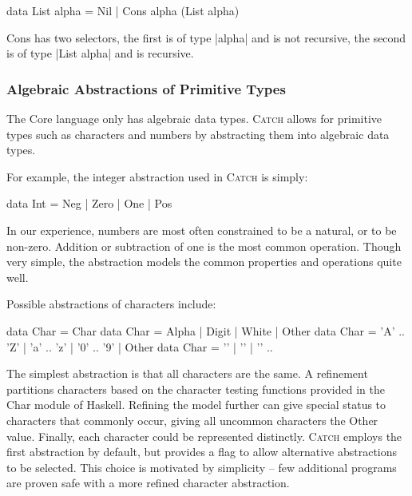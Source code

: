 \documentclass[preprint]{sigplanconf}
\newcommand{\C}[1]{\textsf{#1}}
\newcommand{\catch}{\textsc{Catch}}
\begin{document}
\begin{code}
data List alpha = Nil | Cons alpha (List alpha)
\end{code}

\C{Cons} has two selectors, the first is of type |alpha| and is not recursive, the second is of type |List alpha| and is recursive.

\subsubsection{Algebraic Abstractions of Primitive Types}
\label{sec:abstraction}

The Core language only has algebraic data types. \catch{} allows for primitive types such as characters and numbers by abstracting them into algebraic data types.

\begin{comment}
Natural numbers are often encoded by Peano numerals, and this idea can easily be extended to integers:

\begin{code}
data Pos  = One | Succ Pos
data Int  = Minus Pos | Zero | Plus Pos
\end{code}

Although this abstraction of \C{Int} captures all the underlying detail of the number system, the underlying constraint systems discussed in \S\ref{sec:constraint} would be unable to distinguishing between any pair of numbers both greater than 2, or both less than -2.
\end{comment}

For example, the integer abstraction used in \catch{} is simply:

\begin{code}
data Int = Neg | Zero | One | Pos
\end{code}

In our experience, numbers are most often constrained to be a natural, or to be non-zero. Addition or subtraction of one is the most common operation. Though very simple, the abstraction models the common properties and operations quite well.

Possible abstractions of characters include:

\begin{code}
data Char = Char
data Char = Alpha | Digit | White | Other
data Char = 'A' .. 'Z' | 'a' .. 'z' | '0' .. '9' | Other
data Char = '\0' | '\1' | '\2' ..
\end{code}

\noindent The simplest abstraction is that all characters are the same. A refinement partitions characters based on the character testing functions provided in the \C{Char} module of Haskell. Refining the model further can give special status to characters that commonly occur, giving all uncommon characters the \C{Other} value. Finally, each character could be represented distinctly. \catch{} employs the first abstraction by default, but provides a flag to allow alternative abstractions to be selected. This choice is motivated by simplicity -- few additional programs are proven safe with a more refined character abstraction.
\end{document}
